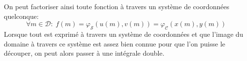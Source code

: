 On peut factoriser ainsi toute fonction à travers un système de coordonnées quelconque:
\begin{displaymath}
\forall m\in \mathcal D:\; f(m)=\varphi_{\mathcal S}(u(m),v(m))= \varphi_{\mathcal C}(x(m),y(m))
\end{displaymath}
Lorsque tout est exprimé à travers un système de coordonnées et que l'image du domaine à travers ce système est assez bien connue pour que l'on puisse le découper, on peut alors passer à une intégrale double.

